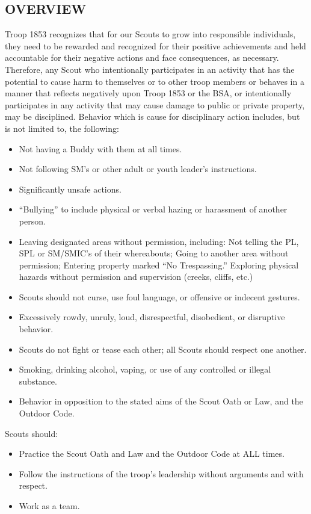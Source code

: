 \documentclass{ltxguide}
\begin{document}
\subsection{OVERVIEW}
Troop 1853 recognizes that for our Scouts to grow into responsible individuals, they need to be rewarded and recognized for their positive achievements and held accountable for their negative actions and face consequences, as necessary. Therefore, any Scout who intentionally participates in an activity that has the potential to cause harm to themselves or to other troop members or behaves in a manner that    reflects negatively upon Troop 1853 or the \ac{BSA}, or intentionally participates in any activity that may cause damage to public or private property, may be disciplined. Behavior which is cause for disciplinary action includes, but is not limited to, the following:
\begin{itemize}
	\item Not having a Buddy with them at all times.
	\item Not following \ac{SM}'s or other adult or youth leader's instructions.
	\item Significantly unsafe actions.
	\item “Bullying” to include physical or verbal hazing or harassment of another person.
	\item Leaving designated areas without permission, including:
		\subitem Not telling the PL, \ac{SPL} or SM/SMIC's of their whereabouts;
		\subitem Going to another area without permission;
		\subitem Entering property marked “No Trespassing.”
		\subitem Exploring physical hazards without permission and supervision (creeks, cliffs, etc.)
	\item Scouts should not curse, use foul language, or offensive or indecent gestures.
	\item Excessively rowdy, unruly, loud, disrespectful, disobedient, or disruptive behavior.
	\item Scouts do not fight or tease each other; all Scouts should respect one another.
	\item Smoking, drinking alcohol, vaping, or use of any controlled or illegal substance.
	\item Behavior in opposition to the stated aims of the Scout Oath or Law, and the Outdoor Code.
\end{itemize}

Scouts should:
\begin{itemize}
	\item Practice the Scout Oath and Law and the Outdoor Code at ALL times.
	\item Follow the instructions of the troop's leadership without arguments and with respect.
	\item Work as a team.
\end{itemize}
\end{document}
